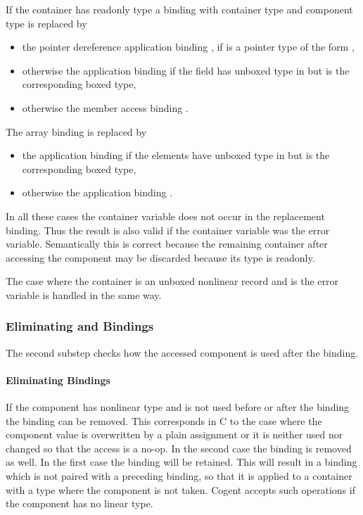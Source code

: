 If the container has readonly type a  binding  with container type 
and component type  is replaced by
\begin{itemize}
\item the pointer dereference application binding , if  is a pointer type of the
form ,
\item otherwise the  application binding  if the field  has unboxed
type in  but  is the corresponding boxed type,
\item otherwise the member access binding .
\end{itemize}
The array  binding  is replaced by
\begin{itemize}
\item the  application binding  if the elements have unboxed
type in  but  is the corresponding boxed type,
\item otherwise the  application binding .
\end{itemize}
In all these cases the container variable  does not occur in the replacement binding. Thus the result is also valid
if the container variable was the error variable. Semantically this is correct because the remaining container after accessing
the component may be discarded because its type is readonly.

The case where the container is an unboxed nonlinear record and  is the error variable is handled in the same way.

\subsubsection{Eliminating  and  Bindings}

The second substep checks how the accessed component is used after the  binding.

\paragraph{Eliminating  Bindings}

If the component has nonlinear type and is not used before or after the  binding the  binding can be removed.
This corresponds in C to the case where the component value is overwritten by a plain assignment or it is neither used nor changed
so that the access is a no-op. In the second case the  binding is removed as well.
In the first case the  binding will be retained. This will result in a  binding which is not paired with
a preceding  binding, so that it is applied to a container with a type where the component is not taken. Cogent
accepts such  operations if the component has no linear type.

